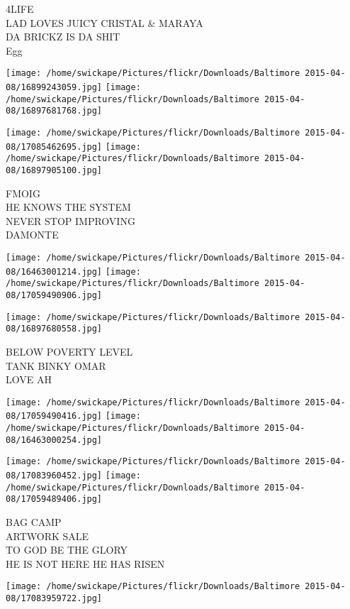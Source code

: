 \documentclass[10pt,letterpaper]{article}
\begin{document}
4LIFE\\
LAD LOVES JUICY CRISTAL \& MARAYA\\
DA BRICKZ IS DA SHIT\\
Egg
\pagebreak

\texttt{[image: /home/swickape/Pictures/flickr/Downloads/Baltimore 2015-04-08/16899243059.jpg]}
\texttt{[image: /home/swickape/Pictures/flickr/Downloads/Baltimore 2015-04-08/16897681768.jpg]}

\texttt{[image: /home/swickape/Pictures/flickr/Downloads/Baltimore 2015-04-08/17085462695.jpg]}
\texttt{[image: /home/swickape/Pictures/flickr/Downloads/Baltimore 2015-04-08/16897905100.jpg]}

FMOIG\\
HE KNOWS THE SYSTEM\\
NEVER STOP IMPROVING\\
DAMONTE
\pagebreak

\texttt{[image: /home/swickape/Pictures/flickr/Downloads/Baltimore 2015-04-08/16463001214.jpg]}
\texttt{[image: /home/swickape/Pictures/flickr/Downloads/Baltimore 2015-04-08/17059490906.jpg]}

\vspace{0.25in}
\texttt{[image: /home/swickape/Pictures/flickr/Downloads/Baltimore 2015-04-08/16897680558.jpg]}

BELOW POVERTY LEVEL\\
TANK BINKY OMAR\\
LOVE AH
\pagebreak

\texttt{[image: /home/swickape/Pictures/flickr/Downloads/Baltimore 2015-04-08/17059490416.jpg]}
\texttt{[image: /home/swickape/Pictures/flickr/Downloads/Baltimore 2015-04-08/16463000254.jpg]}

\texttt{[image: /home/swickape/Pictures/flickr/Downloads/Baltimore 2015-04-08/17083960452.jpg]}
\texttt{[image: /home/swickape/Pictures/flickr/Downloads/Baltimore 2015-04-08/17059489406.jpg]}

BAG CAMP\\
ARTWORK SALE\\
TO GOD BE THE GLORY\\
HE IS NOT HERE HE HAS RISEN
\pagebreak

\texttt{[image: /home/swickape/Pictures/flickr/Downloads/Baltimore 2015-04-08/17083959722.jpg]}
\end{document}
